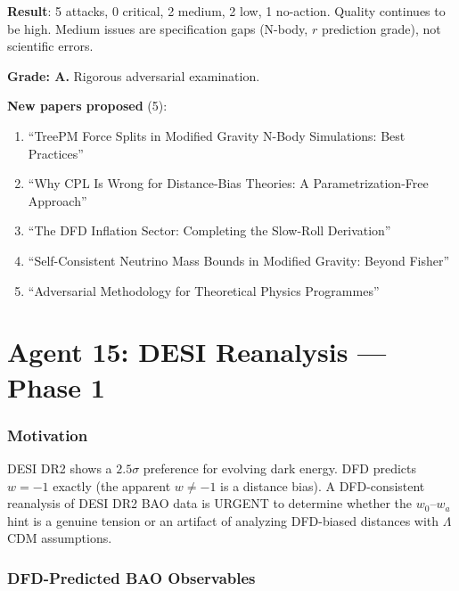 \documentclass[11pt,a4paper]{article}
\begin{document}
\begin{tcolorbox}[colback=green!5!white, colframe=green!60!black, title={Agent 14: Adversarial Review --- 0 Critical, 2 Medium}]
\textbf{Result}: 5 attacks, 0 critical, 2 medium, 2 low, 1 no-action. Quality continues to be high. Medium issues are specification gaps (N-body, $r$ prediction grade), not scientific errors.

\textbf{Grade: A.} Rigorous adversarial examination.

\textbf{New papers proposed} (5):
\begin{enumerate}
\item ``TreePM Force Splits in Modified Gravity N-Body Simulations: Best Practices''
\item ``Why CPL Is Wrong for Distance-Bias Theories: A Parametrization-Free Approach''
\item ``The DFD Inflation Sector: Completing the Slow-Roll Derivation''
\item ``Self-Consistent Neutrino Mass Bounds in Modified Gravity: Beyond Fisher''
\item ``Adversarial Methodology for Theoretical Physics Programmes''
\end{enumerate}
\end{tcolorbox}


\part{Agent 15: DESI Reanalysis --- Phase 1}
\label{part:desi-reanalysis}

\section{Motivation}

DESI DR2 shows a $2.5\sigma$ preference for evolving dark energy. DFD predicts $w = -1$ exactly (the apparent $w \neq -1$ is a distance bias). A DFD-consistent reanalysis of DESI DR2 BAO data is URGENT to determine whether the $w_0$--$w_a$ hint is a genuine tension or an artifact of analyzing DFD-biased distances with $\Lambda$CDM assumptions.

\section{DFD-Predicted BAO Observables}
\end{document}
